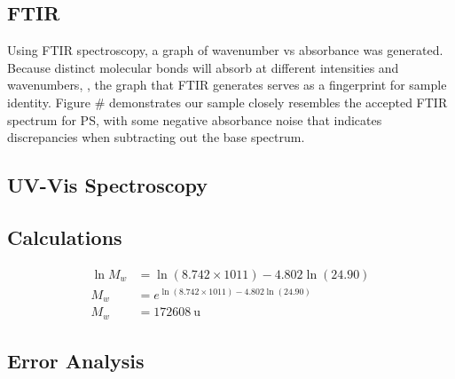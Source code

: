 \documentclass[twocolumn]{article}
\begin{document}
            \subsection{FTIR}
                Using FTIR spectroscopy, a graph of wavenumber vs absorbance  was generated. Because distinct  molecular bonds will absorb at different intensities and wavenumbers, , the graph that FTIR generates serves as a fingerprint for sample identity. Figure \# demonstrates our sample closely resembles the accepted FTIR spectrum for PS, with some negative absorbance noise that indicates discrepancies when subtracting out the base spectrum.
            \subsection{UV-Vis Spectroscopy}
            \subsection{Calculations}
                \begin{align}
                    \ln{M_w} &= \ln{(8.742 \times 1011)} - 4.802 \ln{(24.90)}\\
                    M_w &= e^{\ln{(8.742 \times 1011)} - 4.802 \ln{(24.90)}} \nonumber\\
                    M_w &= \qty{172608}{\atomicmassunit} \nonumber
                \end{align}
            \subsection{Error Analysis}
\end{document}
